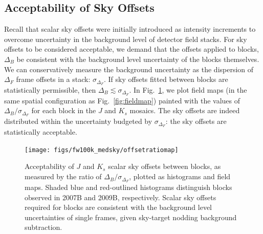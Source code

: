 \documentclass[iop]{emulateapj}
\newcommand{\Fig}[1]{Fig.~\ref{fig:#1}}  %
\begin{document}
\begin{table}[t]
\centering
\caption[Hierarchy of scalar sky offsets]{Hierarchy of scalar sky offsets (using \texttt{FW100K} RT flat fielding, and median background subtraction).
The `Total' sky offsets track the net offset of individual WIRCam image frames into the fitted mosaic.
$\langle I_\mathrm{sky}\rangle$ is taken as the instantaneous background level for the images being sampled (see \Fig{net_sky_level} for the distribution of levels).
Offset distributions are also presented in units of the WIRCam mosaics, DN, corresponding to a zeropoint of 25 mag.}
\label{tab:offset_hierarchy}

\end{table}

\subsection{Acceptability of Sky Offsets}
\label{sec:offset_acceptability}

Recall that scalar sky offsets were initially introduced as intensity increments to overcome uncertainty in the background level of detector field stacks.
For sky offsets to be considered acceptable, we demand that the offsets applied to blocks, $\Delta_B$ be consistent with the background level uncertainty of the blocks themselves.
We can conservatively measure the background uncertainty as the dispersion of $\Delta_F$ frame offsets in a stack: $\sigma_{\Delta_F}$.
If sky offsets fitted between blocks are statistically permissible, then $\Delta_B \lesssim \sigma_{\Delta_F}$.
In \Fig{offset_ratio_map}, we plot field maps (in the same spatial configuration as \Fig{fieldmap}) painted with the values of $\Delta_B / \sigma_{\Delta_F}$ for each block in the $J$ and $K_s$ mosaics.
The sky offsets are indeed distributed within the uncertainty budgeted by $\sigma_{\Delta_F}$: the sky offsets are statistically acceptable.

\begin{figure}[t]
\centering
\texttt{[image: figs/fw100k\_medsky/offsetratiomap]}
\caption{Acceptability of $J$ and $K_s$ scalar sky offsets between blocks, as measured by the ratio of $\Delta_B/\sigma_{\Delta_F}$, plotted as histograms and field maps. Shaded blue and red-outlined histograms distinguish blocks observed in 2007B and 2009B, respectively. Scalar sky offsets required for blocks are consistent with the background level uncertainties of single frames, given sky-target nodding background subtraction.}
\label{fig:offset_ratio_map}
\end{figure}
\end{document}
